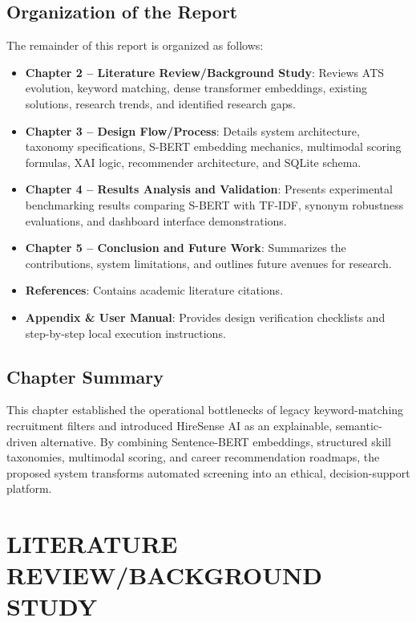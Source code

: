\documentclass[12pt,a4paper]{report}
\begin{document}
\section{Organization of the Report}
The remainder of this report is organized as follows:
\begin{itemize}
    \item \textbf{Chapter 2 -- Literature Review/Background Study}: Reviews ATS evolution, keyword matching, dense transformer embeddings, existing solutions, research trends, and identified research gaps.
    \item \textbf{Chapter 3 -- Design Flow/Process}: Details system architecture, taxonomy specifications, S-BERT embedding mechanics, multimodal scoring formulas, XAI logic, recommender architecture, and SQLite schema.
    \item \textbf{Chapter 4 -- Results Analysis and Validation}: Presents experimental benchmarking results comparing S-BERT with TF-IDF, synonym robustness evaluations, and dashboard interface demonstrations.
    \item \textbf{Chapter 5 -- Conclusion and Future Work}: Summarizes the contributions, system limitations, and outlines future avenues for research.
    \item \textbf{References}: Contains academic literature citations.
    \item \textbf{Appendix \& User Manual}: Provides design verification checklists and step-by-step local execution instructions.
\end{itemize}

\section{Chapter Summary}
This chapter established the operational bottlenecks of legacy keyword-matching recruitment filters and introduced HireSense AI as an explainable, semantic-driven alternative. By combining Sentence-BERT embeddings, structured skill taxonomies, multimodal scoring, and career recommendation roadmaps, the proposed system transforms automated screening into an ethical, decision-support platform.

\chapter{LITERATURE REVIEW/BACKGROUND STUDY}
\end{document}
